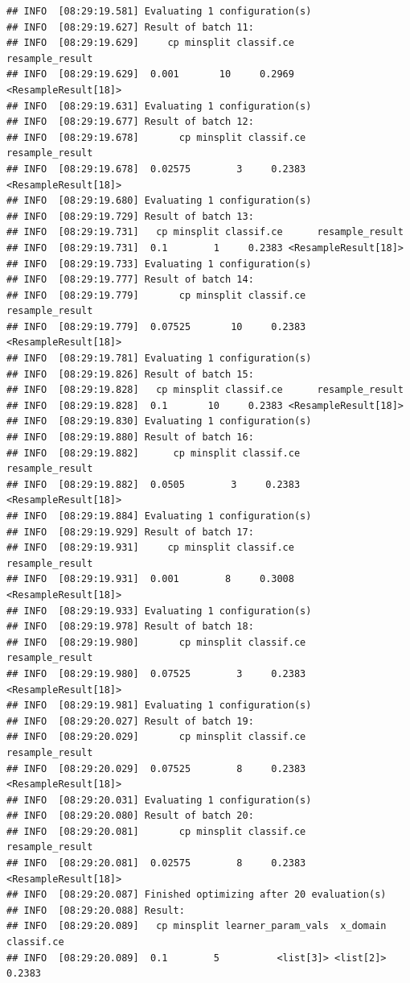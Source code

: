 \documentclass[]{scrbook}
\begin{document}
\begin{verbatim}
## INFO  [08:29:19.581] Evaluating 1 configuration(s) 
## INFO  [08:29:19.627] Result of batch 11: 
## INFO  [08:29:19.629]     cp minsplit classif.ce      resample_result 
## INFO  [08:29:19.629]  0.001       10     0.2969 <ResampleResult[18]> 
## INFO  [08:29:19.631] Evaluating 1 configuration(s) 
## INFO  [08:29:19.677] Result of batch 12: 
## INFO  [08:29:19.678]       cp minsplit classif.ce      resample_result 
## INFO  [08:29:19.678]  0.02575        3     0.2383 <ResampleResult[18]> 
## INFO  [08:29:19.680] Evaluating 1 configuration(s) 
## INFO  [08:29:19.729] Result of batch 13: 
## INFO  [08:29:19.731]   cp minsplit classif.ce      resample_result 
## INFO  [08:29:19.731]  0.1        1     0.2383 <ResampleResult[18]> 
## INFO  [08:29:19.733] Evaluating 1 configuration(s) 
## INFO  [08:29:19.777] Result of batch 14: 
## INFO  [08:29:19.779]       cp minsplit classif.ce      resample_result 
## INFO  [08:29:19.779]  0.07525       10     0.2383 <ResampleResult[18]> 
## INFO  [08:29:19.781] Evaluating 1 configuration(s) 
## INFO  [08:29:19.826] Result of batch 15: 
## INFO  [08:29:19.828]   cp minsplit classif.ce      resample_result 
## INFO  [08:29:19.828]  0.1       10     0.2383 <ResampleResult[18]> 
## INFO  [08:29:19.830] Evaluating 1 configuration(s) 
## INFO  [08:29:19.880] Result of batch 16: 
## INFO  [08:29:19.882]      cp minsplit classif.ce      resample_result 
## INFO  [08:29:19.882]  0.0505        3     0.2383 <ResampleResult[18]> 
## INFO  [08:29:19.884] Evaluating 1 configuration(s) 
## INFO  [08:29:19.929] Result of batch 17: 
## INFO  [08:29:19.931]     cp minsplit classif.ce      resample_result 
## INFO  [08:29:19.931]  0.001        8     0.3008 <ResampleResult[18]> 
## INFO  [08:29:19.933] Evaluating 1 configuration(s) 
## INFO  [08:29:19.978] Result of batch 18: 
## INFO  [08:29:19.980]       cp minsplit classif.ce      resample_result 
## INFO  [08:29:19.980]  0.07525        3     0.2383 <ResampleResult[18]> 
## INFO  [08:29:19.981] Evaluating 1 configuration(s) 
## INFO  [08:29:20.027] Result of batch 19: 
## INFO  [08:29:20.029]       cp minsplit classif.ce      resample_result 
## INFO  [08:29:20.029]  0.07525        8     0.2383 <ResampleResult[18]> 
## INFO  [08:29:20.031] Evaluating 1 configuration(s) 
## INFO  [08:29:20.080] Result of batch 20: 
## INFO  [08:29:20.081]       cp minsplit classif.ce      resample_result 
## INFO  [08:29:20.081]  0.02575        8     0.2383 <ResampleResult[18]> 
## INFO  [08:29:20.087] Finished optimizing after 20 evaluation(s) 
## INFO  [08:29:20.088] Result: 
## INFO  [08:29:20.089]   cp minsplit learner_param_vals  x_domain classif.ce 
## INFO  [08:29:20.089]  0.1        5          <list[3]> <list[2]>     0.2383
\end{verbatim}
\end{document}

